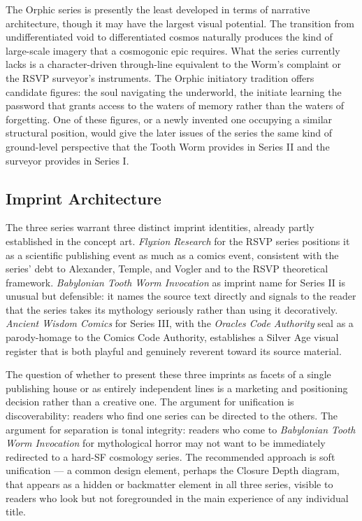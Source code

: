 \documentclass[12pt, a4paper]{article}
\begin{document}
The Orphic series is presently the least developed in terms of narrative architecture, though it may have the largest visual potential. The transition from undifferentiated void to differentiated cosmos naturally produces the kind of large-scale imagery that a cosmogonic epic requires. What the series currently lacks is a character-driven through-line equivalent to the Worm's complaint or the RSVP surveyor's instruments. The Orphic initiatory tradition offers candidate figures: the soul navigating the underworld, the initiate learning the password that grants access to the waters of memory rather than the waters of forgetting. One of these figures, or a newly invented one occupying a similar structural position, would give the later issues of the series the same kind of ground-level perspective that the Tooth Worm provides in Series II and the surveyor provides in Series I.

\subsection{Imprint Architecture}

The three series warrant three distinct imprint identities, already partly established in the concept art. \textit{Flyxion Research} for the RSVP series positions it as a scientific publishing event as much as a comics event, consistent with the series' debt to Alexander, Temple, and Vogler and to the RSVP theoretical framework. \textit{Babylonian Tooth Worm Invocation} as imprint name for Series II is unusual but defensible: it names the source text directly and signals to the reader that the series takes its mythology seriously rather than using it decoratively. \textit{Ancient Wisdom Comics} for Series III, with the \textit{Oracles Code Authority} seal as a parody-homage to the Comics Code Authority, establishes a Silver Age visual register that is both playful and genuinely reverent toward its source material.

The question of whether to present these three imprints as facets of a single publishing house or as entirely independent lines is a marketing and positioning decision rather than a creative one. The argument for unification is discoverability: readers who find one series can be directed to the others. The argument for separation is tonal integrity: readers who come to \textit{Babylonian Tooth Worm Invocation} for mythological horror may not want to be immediately redirected to a hard-SF cosmology series. The recommended approach is soft unification --- a common design element, perhaps the Closure Depth diagram, that appears as a hidden or backmatter element in all three series, visible to readers who look but not foregrounded in the main experience of any individual title.
\end{document}
